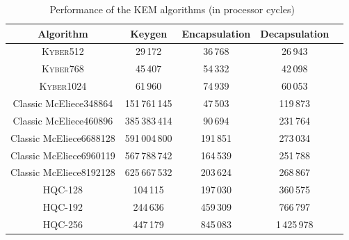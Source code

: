 \begin{table}[h]
    \centering
    \begin{tabular}[p]{| c | c | c | c | c |}
        \hline
        \textbf{Algorithm} & \textbf{Keygen} & \textbf{Encapsulation} & \textbf{Decapsulation} \\ \hline
        \textsc{Kyber512} & 29\,172 & 36\,768 & 26\,943 \\
        \textsc{Kyber768} & 45\,407 & 54\,332 & 42\,098 \\
        \textsc{Kyber1024} & 61\,960 & 74\,939 & 60\,053 \\
        \hline
        Classic McEliece348864 & 151\,761\,145 & 47\,503 & 119\,873 \\
        Classic McEliece460896 & 385\,383\,414 & 90\,694 & 231\,764 \\
        Classic McEliece6688128 & 591\,004\,800 & 191\,851 & 273\,034 \\
        Classic McEliece6960119 & 567\,788\,742 & 164\,539 & 251\,788 \\
        Classic McEliece8192128 & 625\,667\,532 & 203\,624 & 268\,867 \\
        \hline
        HQC-128 & 104\,115 & 197\,030 & 360\,575 \\
        HQC-192 & 244\,636 & 459\,309 & 766\,797 \\
        HQC-256 & 447\,179 & 845\,083 & 1\,425\,978 \\
        \hline
    \end{tabular}
    \caption{Performance of the KEM algorithms (in processor cycles)~\cite{kem.signature.performance}}
    \label{tab:asym.enc.performance}
\end{table}


